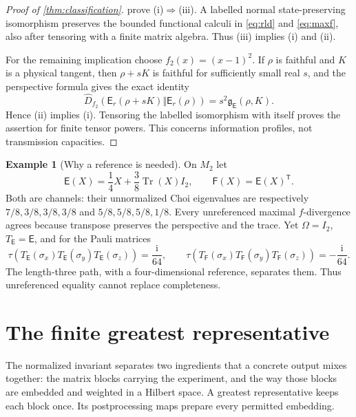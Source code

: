 \documentclass[11pt,reqno]{amsart}
\theoremstyle{definition}
\newtheorem{example}[theorem]{Example}
\theoremstyle{remark}
\numberwithin{equation}{section}
\DeclareMathOperator{\Tr}{Tr}
\newcommand{\E}{\mathsf E}
\newcommand{\F}{\mathsf F}
\newcommand{\ii}{\mathrm i}
\newcommand{\rld}{\mathfrak g}
\newcommand{\maxdiv}{\widehat D}
\begin{document}
\begin{proof}[Proof of \cref{thm:classification}]
 prove \textup{(i)}$\Rightarrow$\textup{(iii)}. A labelled normal state-preserving isomorphism preserves the bounded functional calculi in \eqref{eq:rld} and \eqref{eq:maxf}, also after tensoring with a finite matrix algebra. Thus \textup{(iii)} implies \textup{(i)} and \textup{(ii)}.

For the remaining implication choose $f_2(x)=(x-1)^2$. If $\rho$ is faithful and $K$ is a physical tangent, then $\rho+sK$ is faithful for sufficiently small real $s$, and the perspective formula gives the exact identity
\begin{equation}\label{eq:quadratic-identity}
 \maxdiv_{f_2}(\E_r(\rho+sK)\Vert\E_r(\rho))
 =s^2\rld_\E(\rho,K).
\end{equation}
Hence \textup{(ii)} implies \textup{(i)}. Tensoring the labelled isomorphism with itself proves the assertion for finite tensor powers. This concerns information profiles, not transmission capacities.
\end{proof}

\begin{example}[Why a reference is needed]\label{ex:transpose}
On $M_2$ let
\[
 \E(X)=\frac14X+\frac38\Tr(X)I_2,
 \qquad \F(X)=\E(X)^{\mathsf T}.
\]
Both are channels: their unnormalized Choi eigenvalues are respectively $7/8,3/8,3/8,3/8$ and $5/8,5/8,5/8,1/8$. Every unreferenced maximal $f$-divergence agrees because transpose preserves the perspective and the trace. Yet $\Omega=I_2$, $T_\E=\E$, and for the Pauli matrices
\[
 \tau(T_\E(\sigma_x)T_\E(\sigma_y)T_\E(\sigma_z))
 =\frac{\ii}{64},\qquad
 \tau(T_\F(\sigma_x)T_\F(\sigma_y)T_\F(\sigma_z))
 =-\frac{\ii}{64}.
\]
The length-three path, with a four-dimensional reference, separates them. Thus unreferenced equality cannot replace completeness.
\end{example}



\section{The finite greatest representative}\label{sec:finite}

The normalized invariant separates two ingredients that a concrete output mixes together: the matrix blocks carrying the experiment, and the way those blocks are embedded and weighted in a Hilbert space. A greatest representative keeps each block once. Its postprocessing maps prepare every permitted embedding.
\end{document}
